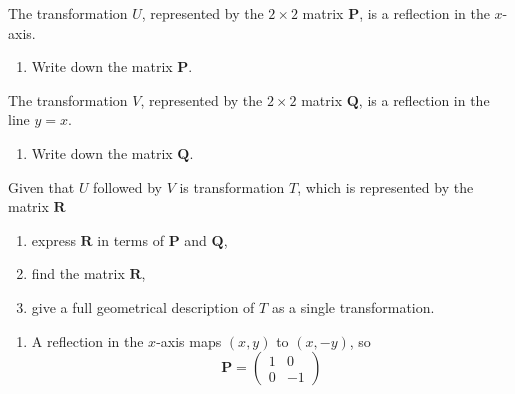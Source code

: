 \documentclass[leqno]{article}
\begin{document}
\djsFrontMatter
\begin{enumerate}[
  label=\textbf{\arabic*.},
  leftmargin=*,
  topsep=0pt,
  partopsep=0pt,
  parsep=0pt
]

\questionitem

The transformation $U$, represented by the $2\times 2$ matrix $\mathbf{P}$, is a reflection in the $x$-axis. \\

\begin{enumerate}[label=\textbf{(\alph*)}]
  \item Write down the matrix $\mathbf{P}$.  \\
\end{enumerate}

The transformation $V$, represented by the $2\times 2$ matrix $\mathbf{Q}$, is a reflection in the line $y=x$. \\

\begin{enumerate}[label=\textbf{(\alph*)}, resume]
  \item Write down the matrix $\mathbf{Q}$.  \\
\end{enumerate}

Given that $U$ followed by $V$ is transformation $T$, which is represented by the matrix $\mathbf{R}$ \\

\begin{enumerate}[label=\textbf{(\alph*)}, resume]
  \item express $\mathbf{R}$ in terms of $\mathbf{P}$ and $\mathbf{Q}$, 
  \item find the matrix $\mathbf{R}$, 
  \item give a full geometrical description of $T$ as a single transformation.  \\
\end{enumerate}

\vspace*{10pt}

\begin{djsSolution}
\begin{enumerate}[label=\textbf{(\alph*)}]
  \item A reflection in the $x$-axis maps $(x,y)$ to $(x,-y)$, so
  \[
  \mathbf{P}=\begin{pmatrix}1&0\\0&-1\end{pmatrix}
  \]


\end{enumerate}
\end{djsSolution}
\end{enumerate}
\end{document}

